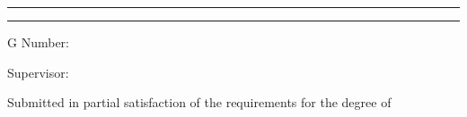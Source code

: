 
\makeatletter
\begin{titlepage}
    \centering

    {\Large \@institution \par}
    \vspace{0.2cm}
    {\large \@affiliation \par}

    \vspace{1cm}
    \rule{\linewidth}{0.6pt}
    \vspace{0.8cm}

    {\huge\bfseries \@title \par}

    \vspace{0.8cm}
    \rule{\linewidth}{0.6pt}
    \vspace{0.5cm}

    {\Large \@reporttype \par}
    \vspace{0.3cm}
    {\large \@coursename \par}

    \vspace{2.5cm}

    {\Large \MakeUppercase{\@author} \par}
    \vspace{0.3cm}
    {\normalsize G Number: \@gnumber \par}
    \vspace{0.2cm}
    {\normalsize Supervisor: \MakeUppercase {\@supervisor} \par}

    \vfill

    {\normalsize Submitted in partial satisfaction of the requirements for the degree of \par}
    \vspace{0.2cm}
    {\normalsize \@degreetitle \par}

    \vspace{1cm}
    {\normalsize \@date \par}

\end{titlepage}
\makeatother
